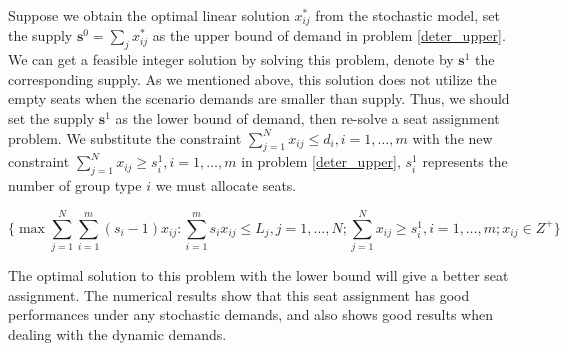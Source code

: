 
Suppose we obtain the optimal linear solution $x^{*}_{ij}$ from the stochastic model, set the supply $\mathbf{s}^{0} = \sum_{j} x^{*}_{ij}$ as the upper bound of demand in problem \eqref{deter_upper}. We can get a feasible integer solution by solving this problem, denote by $\mathbf{s}^{1}$ the corresponding supply. As we mentioned above, this solution does not utilize the empty seats when the scenario demands are smaller than supply. Thus, we should set the supply $\mathbf{s}^{1}$ as the lower bound of demand, then re-solve a seat assignment problem. We substitute the constraint $\sum_{j =1}^{N} x_{ij} \leq d_{i}, i=1,\ldots,m$ with the new constraint $\sum_{j =1}^{N} x_{ij} \geq s_{i}^{1}, i=1,\ldots,m$ in problem \eqref{deter_upper}, $s_{i}^{1}$ represents the number of group type $i$ we must allocate seats.

\begin{equation}\label{deter_lower}
\{\max \sum_{j=1}^{N} \sum_{i=1}^{m}(s_i -1)x_{ij}: \sum_{i = 1}^{m} s_i x_{ij} \leq L_{j}, j=1,\ldots,N; \sum_{j =1}^{N} x_{ij} \geq s_{i}^{1}, i=1,\ldots,m; x_{ij} \in Z^{+} \}
\end{equation}


The optimal solution to this problem with the lower bound will give a better seat assignment. The numerical results show that this seat assignment has good performances under any stochastic demands, and also shows good results when dealing with the dynamic demands. 






